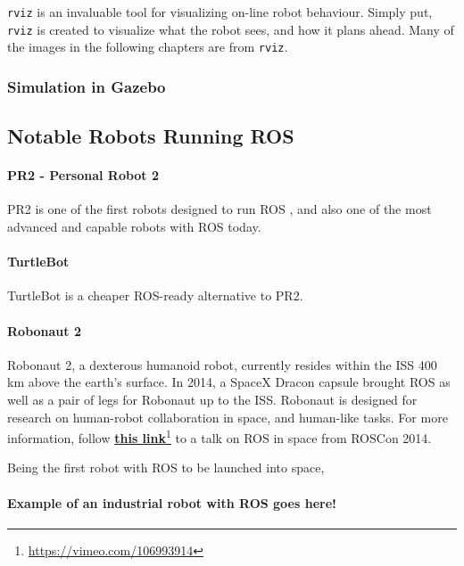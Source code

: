 \texttt{rviz} is an invaluable tool for visualizing on-line robot behaviour. Simply put, \texttt{rviz} is created to visualize what the robot sees, and how it plans ahead. Many of the images in the following chapters are from \texttt{rviz}. 

\subsubsection{Simulation in Gazebo}


\subsection{Notable Robots Running ROS}

\paragraph{PR2 - Personal Robot 2}

PR2 is one of the first robots designed to run \ac{ROS} \cite{rosbook15}, and also one of the most advanced and capable robots with \ac{ROS} today. 

\paragraph{TurtleBot} 

TurtleBot is a cheaper ROS-ready alternative to PR2. 

\paragraph{Robonaut 2}

Robonaut 2, a dexterous humanoid robot, currently resides within the \ac{ISS} 400 km above the earth's surface. In 2014, a SpaceX Dracon capsule brought \ac{ROS} as well as a pair of legs for Robonaut up to the \ac{ISS}\cite{ROS_space}. Robonaut is designed for research on human-robot collaboration in space, and human-like tasks. For more information, follow \href{https://vimeo.com/106993914}{\textbf{this link}}\footnote{\url{https://vimeo.com/106993914}} to a talk on \ac{ROS} in space from ROSCon 2014.

Being the first robot with \ac{ROS} to be launched into space, 

\paragraph{Example of an industrial robot with ROS goes here!}

